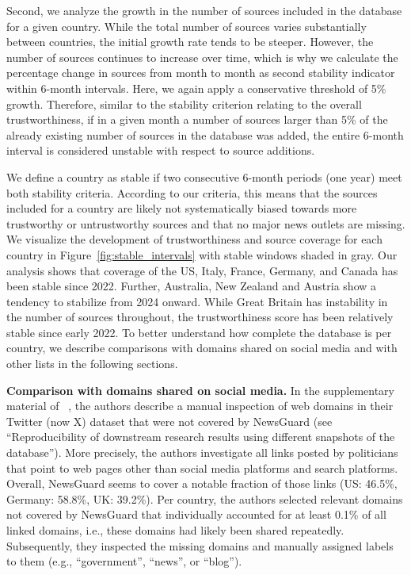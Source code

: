 \documentclass[12pt,twoside]{article}
\begin{document}
Second, we analyze the growth in the number of sources included in the database for a given country. 
While the total number of sources varies substantially between countries, the initial growth rate tends to be steeper. 
However, the number of sources continues to increase over time, which is why we calculate the percentage change in sources from month to month as second stability indicator within 6-month intervals.
Here, we again apply a conservative threshold of 5\% growth. 
Therefore, similar to the stability criterion relating to the overall trustworthiness, if in a given month a number of sources larger than 5\% of the already existing number of sources in the database was added, the entire 6-month interval is considered unstable with respect to source additions.

We define a country as stable if two consecutive 6-month periods (one year) meet both stability criteria. 
According to our criteria, this means that the sources included for a country are likely not systematically biased towards more trustworthy or untrustworthy sources and that no major news outlets are missing. 
We visualize the development of trustworthiness and source coverage for each country in Figure~\ref{fig:stable_intervals} with stable windows shaded in gray.
Our analysis shows that coverage of the US, Italy, France, Germany, and Canada has been stable since 2022. 
Further, Australia, New Zealand and Austria show a tendency to stabilize from 2024 onward. 
While Great Britain has instability in the number of sources throughout, the trustworthiness score has been relatively stable since early 2022. 
To better understand how complete the database is per country, we describe comparisons with domains shared on social media and with other lists in the following sections.

\textbf{Comparison with domains shared on social media.}
In the supplementary material of ~\cite{lasserSocialMediaSharing2022c}, the authors describe a manual inspection of web domains in their Twitter (now X) dataset that were not covered by NewsGuard (see ``Reproducibility of downstream research results using different snapshots of the database''). 
More precisely, the authors investigate all links posted by politicians that point to web pages other than social media platforms and search platforms. 
Overall, NewsGuard seems to cover a notable fraction of those links (US: 46.5\%, Germany: 58.8\%, UK: 39.2\%). 
Per country, the authors selected relevant domains not covered by NewsGuard that individually accounted for at least 0.1\% of all linked domains, i.e., these domains had likely been shared repeatedly. 
Subsequently, they inspected the missing domains and manually assigned labels to them (e.g., ``government'', ``news'', or ``blog'').
\end{document}
